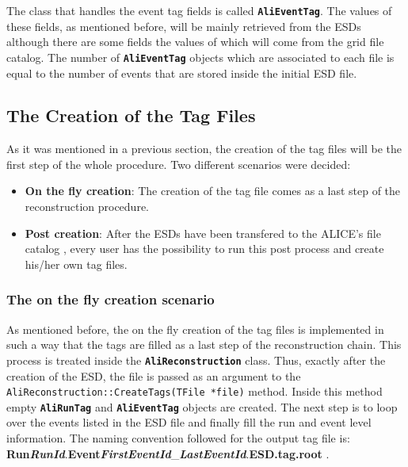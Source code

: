\documentclass[12pt,a4paper,twoside]{article}
\newcommand{\class}[1]{\texttt{\textbf{#1}}\xspace}
\newcommand{\method}[1]{\texttt{#1}\xspace}
\begin{document}
{The class that handles the event tag fields is called
\class{AliEventTag}. The values of these fields, as mentioned before,
will be mainly retrieved from the ESDs although there are some fields
the values of which will come from the grid file catalog. The number
of \class{AliEventTag} objects which are associated to each file is
equal to the number of events that are stored inside the initial ESD
file.

\subsection{The Creation of the Tag Files}

As it was mentioned in a previous section, the creation of the tag
files will be the first step of the whole procedure. Two different
scenarios were decided: 

\begin{itemize}

\item \textbf{On the fly creation}: The creation of the tag file comes
  as a last step of the reconstruction procedure.  

\item \textbf{Post creation}: After the ESDs have been transfered to
  the ALICE's file catalog \cite{AliEn}, every user has the
  possibility to run this post process and create his/her own tag
  files. 

\end{itemize}

\subsubsection{The on the fly creation scenario}

As mentioned before, the on the fly creation of the tag files is
implemented in such a way that the tags are filled as a last step of
the reconstruction chain. This process is treated inside the
\class{AliReconstruction} class. Thus, exactly after the creation of
the ESD, the file is passed as an argument to the
\method{AliReconstruction::CreateTags(TFile *file)} method. Inside
this method empty \class{AliRunTag} and \class{AliEventTag} objects
are created. The next step is to loop over the events listed in the
ESD file and finally fill the run and event level information. The
naming convention followed for the output tag file is:
\textbf{Run}\textbf{\textit{RunId}}.\textbf{Event}\textbf{\textit{FirstEventId}}\_\textbf{\textit{LastEventId}}.\textbf{ESD.tag.root}
\cite{EventTagWeb}. 

}
\end{document}
